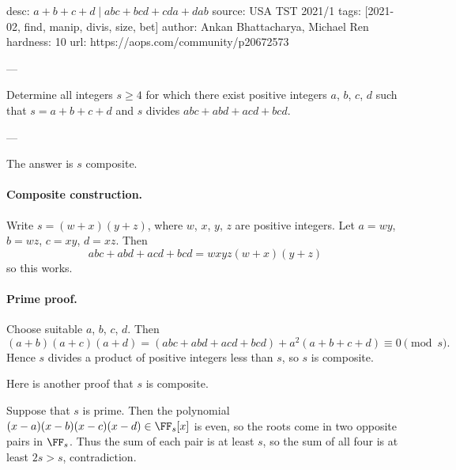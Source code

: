 desc: $a+b+c+d \mid abc+bcd+cda+dab$
source: USA TST 2021/1
tags: [2021-02, find, manip, divis, size, bet]
author: Ankan Bhattacharya, Michael Ren
hardness: 10
url: https://aops.com/community/p20672573

---

Determine all integers $s \ge 4$
for which there exist positive integers $a$, $b$, $c$, $d$
such that $s = a+b+c+d$
and $s$ divides $abc+abd+acd+bcd$.

---

The answer is $s$ composite.

\paragraph{Composite construction.}
Write $s = (w+x)(y+z)$,
where $w$, $x$, $y$, $z$ are positive integers.
Let $a=wy$, $b=wz$, $c=xy$, $d=xz$.
Then
\[ abc+abd+acd+bcd = wxyz(w+x)(y+z) \]
so this works.

\paragraph{Prime proof.}
Choose suitable $a$, $b$, $c$, $d$. Then
\[
  (a+b)(a+c)(a+d)
  = (abc+abd+acd+bcd) + a^2(a+b+c+d)
  \equiv 0 \pmod s.
\]
Hence $s$ divides a product of positive integers less than $s$,
so $s$ is composite.

\begin{remark*}
  Here is another proof that $s$ is composite.

  Suppose that $s$ is prime.
  Then the polynomial $(x-a)(x-b)(x-c)(x-d) \in \FF_s[x]$
  is even, so the roots come in two opposite pairs in $\FF_s$.
  Thus the sum of each pair is at least $s$,
  so the sum of all four is at least $2s > s$, contradiction.
\end{remark*}
